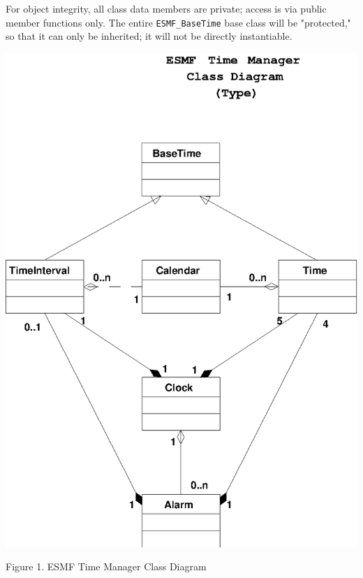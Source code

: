 For object integrity, all class data members are private; access is via
public member functions only. The entire {\tt ESMF\_BaseTime} base class
will be "protected," so that it can only be inherited; it will not be directly
instantiable.

\begin{center}
\includegraphics{TimeMgrClass.EPS}
   
Figure 1.  ESMF Time Manager Class Diagram
   
\end{center}
